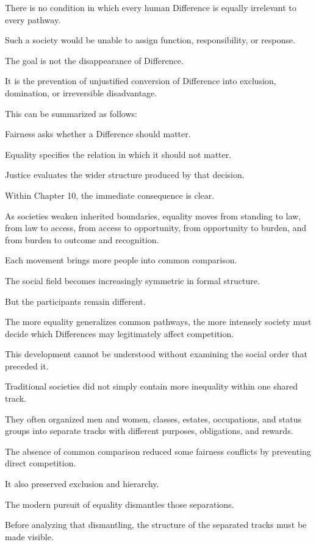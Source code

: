 There is no condition in which every human Difference is equally irrelevant to every pathway.

Such a society would be unable to assign function, responsibility, or response.

The goal is not the disappearance of Difference.

It is the prevention of unjustified conversion of Difference into exclusion, domination, or irreversible disadvantage.

This can be summarized as follows:

Fairness asks whether a Difference should matter.

Equality specifies the relation in which it should not matter.

Justice evaluates the wider structure produced by that decision.

Within Chapter 10, the immediate consequence is clear.

As societies weaken inherited boundaries, equality moves from standing to law, from law to access, from access to opportunity, from opportunity to burden, and from burden to outcome and recognition.

Each movement brings more people into common comparison.

The social field becomes increasingly symmetric in formal structure.

But the participants remain different.

The more equality generalizes common pathways, the more intensely society must decide which Differences may legitimately affect competition.

This development cannot be understood without examining the social order that preceded it.

Traditional societies did not simply contain more inequality within one shared track.

They often organized men and women, classes, estates, occupations, and status groups into separate tracks with different purposes, obligations, and rewards.

The absence of common comparison reduced some fairness conflicts by preventing direct competition.

It also preserved exclusion and hierarchy.

The modern pursuit of equality dismantles those separations.

Before analyzing that dismantling, the structure of the separated tracks must be made visible.


